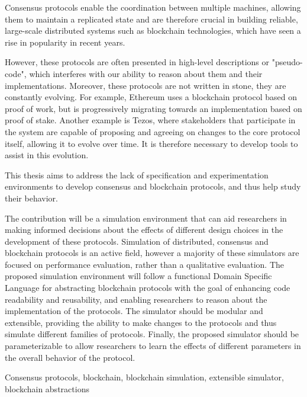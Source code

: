 


Consensus protocols enable the coordination between multiple machines, allowing them to maintain a replicated state and are therefore crucial in building reliable, large-scale distributed systems such as blockchain technologies, which have seen a rise in popularity in recent years.

However, these protocols are often presented in high-level descriptions or "pseudo-code", which interferes with our ability to reason about them and their implementations. Moreover, these protocols are not written in stone, they are constantly evolving. For example, Ethereum uses a blockchain protocol based on proof of work, but is progressively migrating towards an implementation based on proof of stake. Another example is Tezos, where stakeholders that participate in the system are capable of proposing and agreeing on changes to the core protocol itself, allowing it to evolve over time. It is therefore necessary to develop tools to assist in this evolution.

This thesis aims to address the lack of specification and experimentation environments to develop consensus and blockchain protocols, and thus help study their behavior.

The contribution will be a simulation environment that can aid researchers in making informed decisions about the effects of different design choices in the development of these protocols. Simulation of distributed, consensus and blockchain protocols is an active field, however a majority of these simulators are focused on performance evaluation, rather than a qualitative evaluation. The proposed simulation environment will follow a functional Domain Specific Language for abstracting blockchain protocols with the goal of enhancing code readability and reusability, and enabling researchers to reason about the implementation of the protocols. The simulator should be modular and extensible, providing the ability to make changes to the protocols and thus simulate different families of protocols. Finally, the proposed simulator should be parameterizable to allow researchers to learn the effects of different parameters in the overall behavior of the protocol.





\begin{keywords}
Consensus protocols, blockchain, blockchain simulation, extensible simulator, blockchain abstractions
\end{keywords} 
